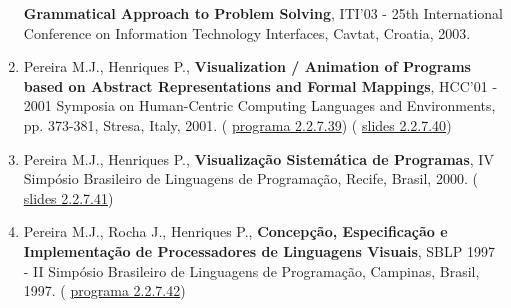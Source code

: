 \documentclass[11pt]{article}
\begin{document}
\begin{enumerate}
{{\bf{ Grammatical Approach to Problem Solving}}, ITI'03 - 25th International Conference on Information Technology Interfaces, Cavtat, Croatia, 2003.}
\item{Pereira M.J., Henriques P., {
\bf{ Visualization / Animation of Programs based on Abstract Representations and Formal Mappings}}, HCC'01 - 2001 Symposia on Human-Centric Computing Languages and Environments, pp. 373-381, Stresa, Italy, 2001. (
\href{run:ComunicacoesOrais/programas/HCC2001Program.pdf}{programa 2.2.7.39}) (
\href{run:ComunicacoesOrais/HCC01apres.pdf}{slides 2.2.7.40})}
\item{Pereira M.J., Henriques P., {
\bf{ Visualização Sistemática de Programas}}, IV Simpósio Brasileiro de Linguagens de Programação, Recife, Brasil, 2000. (
\href{run:ComunicacoesOrais/SBLP00apres.pdf}{slides 2.2.7.41})}
\item{Pereira M.J., Rocha J., Henriques P., {
\bf{ Concepção, Especificação e Implementação de Processadores de Linguagens Visuais}}, SBLP 1997 - II Simpósio Brasileiro de Linguagens de Programação, Campinas, Brasil, 1997. (
\href{run:ComunicacoesOrais/programas/SBLP1997.pdf}{programa 2.2.7.42})}
\end{enumerate}
\end{document}
